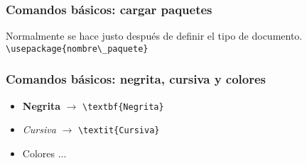 
\begin{frame}[fragile]
\frametitle{Comandos básicos: cargar paquetes}
Normalmente se hace justo después de definir el tipo de documento.
\verb|\usepackage{nombre\_paquete}|
\end{frame}

\begin{frame}[fragile]
\frametitle{Comandos básicos: negrita, cursiva y colores}
\begin{itemize}
    \item \textbf{Negrita} $\rightarrow$ \verb|\textbf{Negrita}|
    \item \textit{Cursiva} $\rightarrow$ \verb|\textit{Cursiva}|
    \item Colores ...
\end{itemize}

\end{frame}

